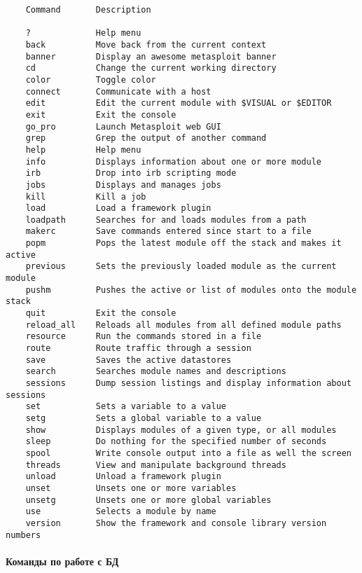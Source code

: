 \documentclass[10pt,a4paper]{article}
\begin{document}
\begin{verbatim}
    Command       Description
  
    ?             Help menu
    back          Move back from the current context
    banner        Display an awesome metasploit banner
    cd            Change the current working directory
    color         Toggle color
    connect       Communicate with a host
    edit          Edit the current module with $VISUAL or $EDITOR
    exit          Exit the console
    go_pro        Launch Metasploit web GUI
    grep          Grep the output of another command
    help          Help menu
    info          Displays information about one or more module
    irb           Drop into irb scripting mode
    jobs          Displays and manages jobs
    kill          Kill a job
    load          Load a framework plugin
    loadpath      Searches for and loads modules from a path
    makerc        Save commands entered since start to a file
    popm          Pops the latest module off the stack and makes it active
    previous      Sets the previously loaded module as the current module
    pushm         Pushes the active or list of modules onto the module stack
    quit          Exit the console
    reload_all    Reloads all modules from all defined module paths
    resource      Run the commands stored in a file
    route         Route traffic through a session
    save          Saves the active datastores
    search        Searches module names and descriptions
    sessions      Dump session listings and display information about sessions
    set           Sets a variable to a value
    setg          Sets a global variable to a value
    show          Displays modules of a given type, or all modules
    sleep         Do nothing for the specified number of seconds
    spool         Write console output into a file as well the screen
    threads       View and manipulate background threads
    unload        Unload a framework plugin
    unset         Unsets one or more variables
    unsetg        Unsets one or more global variables
    use           Selects a module by name
    version       Show the framework and console library version numbers
\end{verbatim}

\paragraph{Команды по работе с БД}
~
\end{document}

